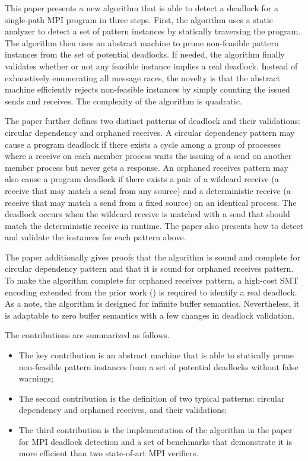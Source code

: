 This paper presents a new algorithm that is able to detect a deadlock for a single-path MPI program in three steps. First, the algorithm uses a static analyzer to detect a set of pattern instances by statically traversing the program. The algorithm then uses an abstract machine to prune non-feasible pattern instances from the set of potential deadlocks. If needed, the algorithm finally validates whether or not any feasible instance implies a real deadlock. Instead of exhaustively enumerating all message races, the novelty is that the abstract machine efficiently rejects non-feasible instances by simply counting the issued sends and receives. The complexity of the algorithm is quadratic. 

The paper further defines two distinct patterns of deadlock and their validations: circular dependency and orphaned receives. A circular dependency pattern may cause a program deadlock if there exists a cycle among a group of processes where a receive on each member process waits the issuing of a send on another member process but never gets a response. An orphaned receives pattern may also cause a program deadlock if there exists a pair of a wildcard receive (a receive that may match a send from any source) and a deterministic receive (a receive that may match a send from a fixed source) on an identical process. The deadlock occurs when the wildcard receive is matched with a send that should match the deterministic receive in runtime. The paper also presents how to detect and validate the instances for each pattern above.

The paper additionally gives proofs that the algorithm is sound and complete for circular dependency pattern and that it is sound for orphaned receives pattern. To make the algorithm complete for orphaned receives pattern, a high-cost SMT encoding extended from the prior work (\cite{DBLP:conf/kbse/HuangMM13,HuangNFM15}) is required to identify a real deadlock. As a note, the algorithm is designed for infinite buffer semantics. Nevertheless, it is adaptable to zero buffer semantics with a few changes in deadlock validation.

The contributions are summarized as follows.
\begin{itemize}
\item The key contribution is an abstract machine that is able to statically prune non-feasible pattern instances from a set of potential deadlocks without false warnings; 
\item The second contribution is the definition of two typical patterns: circular dependency and orphaned receives, and their validations;
\item The third contribution is the implementation of the algorithm in the paper for MPI deadlock detection and a set of benchmarks that demonstrate it is more efficient than two state-of-art MPI verifiers.
\end{itemize}

